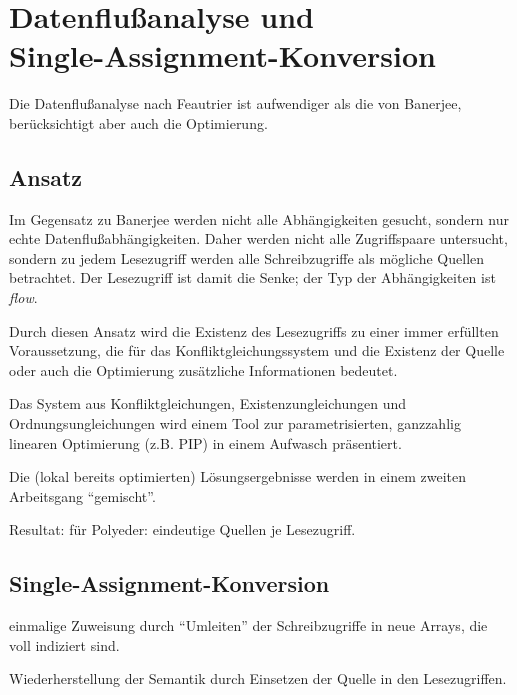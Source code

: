 \section{Datenflußanalyse und \\Single-Assignment-Konversion}
Die Datenflußanalyse nach Feautrier \cite{Fea91} ist aufwendiger als die von
Banerjee, berücksichtigt aber auch die Optimierung. 

\subsection{Ansatz}
Im Gegensatz zu Banerjee werden nicht alle Abhängigkeiten gesucht,
sondern nur echte Datenflußabhängigkeiten. Daher werden nicht alle
Zugriffspaare untersucht, sondern zu jedem Lesezugriff werden alle
Schreibzugriffe als mögliche Quellen betrachtet. Der Lesezugriff ist
damit die Senke; der Typ der Abhängigkeiten ist \emph{flow}.

Durch diesen Ansatz wird die Existenz des Lesezugriffs zu einer immer
erfüllten Voraussetzung, die für das Konfliktgleichungssystem und die
Existenz der Quelle oder auch die Optimierung zusätzliche Informationen
bedeutet.

Das System aus Konfliktgleichungen, Existenzungleichungen und
Ordnungsungleichungen wird einem Tool zur parametrisierten, ganzzahlig
linearen Optimierung (z.B. PIP) in einem Aufwasch präsentiert.

Die (lokal bereits optimierten) Lösungsergebnisse werden in einem
zweiten Arbeitsgang ``gemischt''.

Resultat: für Polyeder: eindeutige Quellen je Lesezugriff.

\subsection{Single-Assignment-Konversion}
\begin{\itemize}
\item einmalige Zuweisung durch ``Umleiten'' der Schreibzugriffe in
  neue Arrays, die voll indiziert sind.
\item Wiederherstellung der Semantik durch Einsetzen der Quelle in den
  Lesezugriffen.
\end{\itemize}

